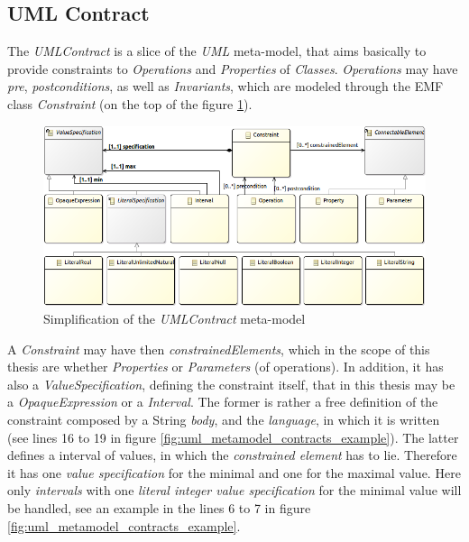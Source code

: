 \documentclass[tuberlin,cic,tc,english,noabntcite]{iiufrgs}
\begin{document}
\subsection{UML Contract}
The \emph{UMLContract} is a slice of the \emph{UML} meta-model, that aims basically to provide constraints to \emph{Operations} and \emph{Properties} of \emph{Classes}. \emph{Operations} may have \emph{pre}, \emph{postconditions}, as well as \emph{Invariants}, which are modeled through the EMF class \emph{Constraint} (on the top of the figure \ref{fig:uml_metamodel_contracts}).

\begin{figure}[h]
    \caption{Simplification of the \emph{UMLContract} meta-model}
    \begin{center}
        \includegraphics[width=\textwidth]{umlContractSimple01}
    \end{center}
    \label{fig:uml_metamodel_contracts}
\end{figure}

A \emph{Constraint} may have then \emph{constrainedElements}, which in the scope of this thesis are whether \emph{Properties} or \emph{Parameters} (of operations). In addition, it has also a \emph{ValueSpecification}, defining the constraint itself, that in this thesis may be a \emph{OpaqueExpression} or a \emph{Interval}. The former is rather a free definition of the constraint composed by a String \emph{body}, and the \emph{language}, in which it is written (see lines 16 to 19 in figure \ref{fig:uml_metamodel_contracts_example}). The latter defines a interval of values, in which the \emph{constrained element} has to lie. Therefore it has one \emph{value specification} for the minimal and one for the maximal value. Here only \emph{intervals} with one \emph{literal integer value specification} for the minimal value will be handled, see an example in the lines 6 to 7 in figure \ref{fig:uml_metamodel_contracts_example}.
\end{document}
